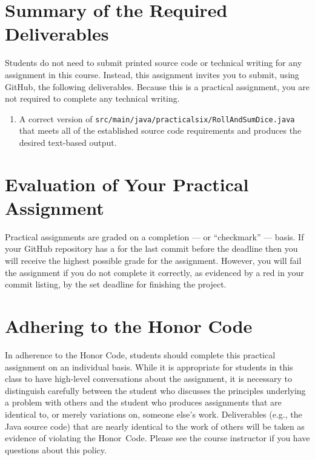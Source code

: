 \documentclass[11pt]{article}
\newcommand{\mainprogramsource}{\lstinline{src/main/java/practicalsix/RollAndSumDice.java}}
\newcommand{\checkmark}{\ding{51}}
\newcommand{\naughtmark}{\ding{55}}
\begin{document}
\section*{Summary of the Required Deliverables}

\noindent Students do not need to submit printed source code or technical
writing for any assignment in this course. Instead, this assignment invites you
to submit, using GitHub, the following deliverables. Because this is a practical
assignment, you are not required to complete any technical writing.

\begin{enumerate}

\setlength{\itemsep}{0in}

\item A correct version of \mainprogramsource{} that meets all of the
  established source code requirements and produces the desired text-based
  output.

\end{enumerate}

\section*{Evaluation of Your Practical Assignment}

Practical assignments are graded on a completion --- or ``checkmark'' --- basis.
If your GitHub repository has a \checkmark{} for the last commit before the
deadline then you will receive the highest possible grade for the assignment.
However, you will fail the assignment if you do not complete it correctly, as
evidenced by a red \naughtmark{} in your commit listing, by the set deadline for
finishing the project.

\section*{Adhering to the Honor Code}

In adherence to the Honor Code, students should complete this practical
assignment on an individual basis. While it is appropriate for students in this
class to have high-level conversations about the assignment, it is necessary to
distinguish carefully between the student who discusses the principles
underlying a problem with others and the student who produces assignments that
are identical to, or merely variations on, someone else's work. Deliverables
(e.g., the Java source code) that are nearly identical to the work of others
will be taken as evidence of violating the \mbox{Honor Code}. Please see the
course instructor if you have questions about this policy.
\end{document}
